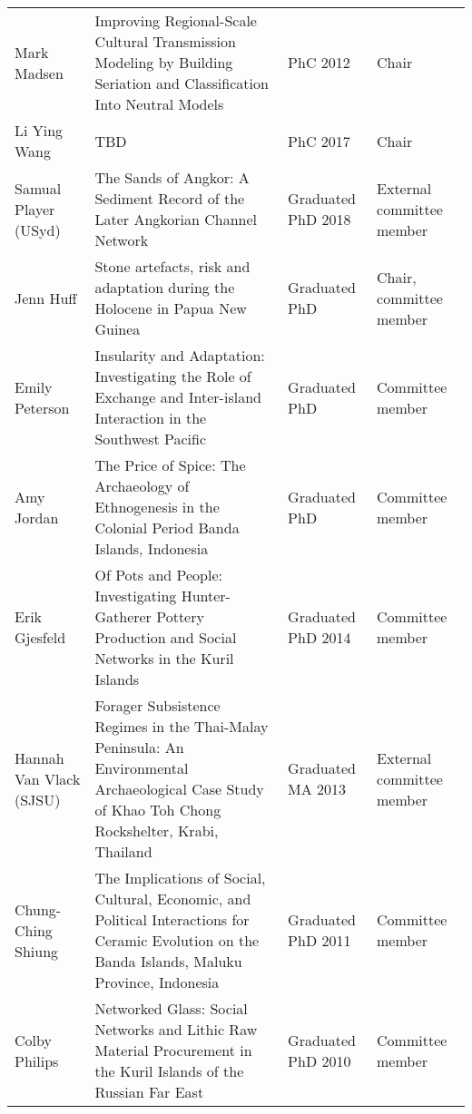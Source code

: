 \documentclass[11pt,article,oneside,oldfontcommands]{memoir}
\begin{document}
\begin{Spacing}{0.7}
\begin{center}
\begin{longtable}{ l L{6cm} p{2cm}  p{2cm} }
    Mark Madsen             & Improving Regional-Scale Cultural Transmission Modeling by Building Seriation and Classification Into Neutral Models                                         & PhC 2012           & Chair                          \\
    Li Ying Wang           & TBD                                                                                                                                                          & PhC 2017            & Chair                        \\
    Samual Player (USyd)           &  The Sands of Angkor: A Sediment Record of the Later Angkorian Channel Network                                                                       & Graduated PhD 2018             & External committee member                         \\
    Jenn Huff               & Stone artefacts, risk and adaptation during the Holocene in Papua New Guinea                                                                                 & Graduated PhD           & Chair, committee member        \\
    Emily Peterson          & Insularity and Adaptation: Investigating the Role of Exchange and Inter-island Interaction in the Southwest Pacific                                          & Graduated PhD           & Committee member               \\
    Amy Jordan              & The Price of Spice: The Archaeology of Ethnogenesis in the Colonial Period Banda Islands, Indonesia                                                          & Graduated PhD           & Committee member               \\
    Erik Gjesfeld           & Of Pots and People: Investigating Hunter-Gatherer Pottery Production and Social Networks in the Kuril Islands                                                & Graduated PhD 2014 & Committee member               \\
    Hannah Van Vlack (SJSU) & Forager Subsistence Regimes in the Thai-Malay Peninsula: An Environmental Archaeological Case Study of Khao Toh Chong Rockshelter, Krabi, Thailand           & Graduated MA 2013  & External committee member      \\
    Chung-Ching Shiung      & The Implications of Social, Cultural, Economic, and Political Interactions for Ceramic Evolution on the Banda Islands, Maluku Province, Indonesia            & Graduated PhD 2011 & Committee member              \\
    Colby Philips           & Networked Glass: Social Networks and Lithic Raw Material Procurement in the Kuril Islands of the Russian Far East                                            & Graduated PhD 2010 & Committee member               \\

\end{longtable}
\end{center}
\end{Spacing}
\end{document}
